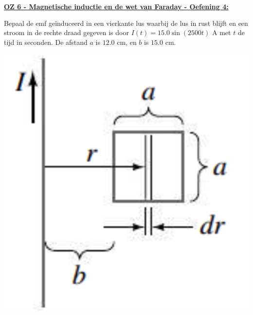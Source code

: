 \textbf{\underline{OZ 6 - Magnetische inductie en de wet van Faraday - Oefening 4:}}
\vspace{0.5cm}

    Bepaal de emf geïnduceerd in een vierkante lus waarbij de lus in rust blijft en een stroom in de rechte draad gegeven is door $I(t) = 15.0\sin(2500t)$ A met $t$ de tijd in seconden. De afstand $a$ is $12.0$ cm, en $b$ is $15.0$ cm.

    \begin{center}
        \includegraphics[scale = 0.18]{oz06/resources/Oz6Oef4.png}
    \end{center}

    \begin{description}[labelwidth=1.5cm, leftmargin=!]
        \item[Geg. :]
        \item[Gevr. :] 
        \item[Opl. :]
    \end{description}


\vspace{1cm}
